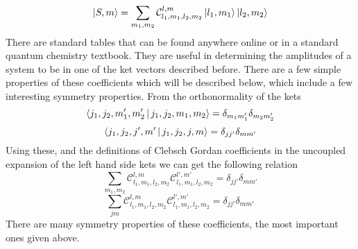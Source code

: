 \documentclass[12pt]{article}
\begin{document}
$$\Ket{S,m} = \sum_{m_1,m_2}\mathcal{C}_{l_1,m_1,l_2,m_2}^{l,m}\Ket{l_1,m_1}\Ket{l_2,m_2}$$ There are standard tables that can be found anywhere online or in a standard quantum chemistry textbook. They are useful in determining the amplitudes of a system to be in one of the ket vectors described before. There are a few simple properties of these coefficients which will be described below, which include a few interesting symmetry properties. From the orthonormality of the kets $$\Braket{j_1,j_2,m'_1,m'_2|j_1,j_2,m_1,m_2} = \delta_{m_1m'_1}\delta_{m_2m'_2}$$
$$\Braket{j_1,j_2,j',m'|j_1,j_2,j,m} = \delta_{jj'}\delta_{mm'}$$ Using these, and the definitions of Clebsch Gordan coefficients in the uncoupled expansion of the left hand side kets we can get the following relation 
$$\sum_{m_1,m_2}\mathcal{C}_{l_1,m_1,l_2,m_2}^{l,m}\mathcal{C}_{l_1,m_1,l_2,m_2}^{l',m'} = \delta_{jj'}\delta_{mm'}$$
$$\sum_{jm}\mathcal{C}_{l_1,m_1,l_2,m_2}^{l,m}\mathcal{C}_{l_1,m_1,l_2,m_2}^{l',m'} = \delta_{jj'}\delta_{mm'}$$
There are many symmetry properties of these coefficients, the most important ones given above. 
\end{document}
